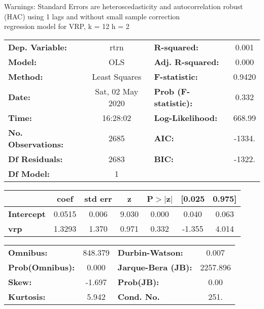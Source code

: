 Warnings: \newline
 [1] Standard Errors are heteroscedasticity and autocorrelation robust (HAC) using 1 lags and without small sample correction\\ 

regression model for VRP, k = 12 h = 2\begin{center}
\begin{tabular}{lclc}
\toprule
\textbf{Dep. Variable:}    &       rtrn       & \textbf{  R-squared:         } &     0.001   \\
\textbf{Model:}            &       OLS        & \textbf{  Adj. R-squared:    } &     0.000   \\
\textbf{Method:}           &  Least Squares   & \textbf{  F-statistic:       } &    0.9420   \\
\textbf{Date:}             & Sat, 02 May 2020 & \textbf{  Prob (F-statistic):} &    0.332    \\
\textbf{Time:}             &     16:28:02     & \textbf{  Log-Likelihood:    } &    668.99   \\
\textbf{No. Observations:} &        2685      & \textbf{  AIC:               } &    -1334.   \\
\textbf{Df Residuals:}     &        2683      & \textbf{  BIC:               } &    -1322.   \\
\textbf{Df Model:}         &           1      & \textbf{                     } &             \\
\bottomrule
\end{tabular}
\begin{tabular}{lcccccc}
                   & \textbf{coef} & \textbf{std err} & \textbf{z} & \textbf{P$> |$z$|$} & \textbf{[0.025} & \textbf{0.975]}  \\
\midrule
\textbf{Intercept} &       0.0515  &        0.006     &     9.030  &         0.000        &        0.040    &        0.063     \\
\textbf{vrp}       &       1.3293  &        1.370     &     0.971  &         0.332        &       -1.355    &        4.014     \\
\bottomrule
\end{tabular}
\begin{tabular}{lclc}
\textbf{Omnibus:}       & 848.379 & \textbf{  Durbin-Watson:     } &    0.007  \\
\textbf{Prob(Omnibus):} &   0.000 & \textbf{  Jarque-Bera (JB):  } & 2257.896  \\
\textbf{Skew:}          &  -1.697 & \textbf{  Prob(JB):          } &     0.00  \\
\textbf{Kurtosis:}      &   5.942 & \textbf{  Cond. No.          } &     251.  \\
\bottomrule
\end{tabular}
\end{center}

